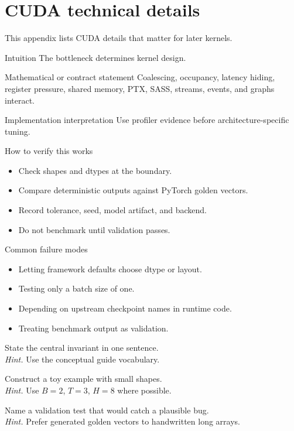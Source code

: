 \chapter{CUDA technical details}
\label{app:cuda-details}
This appendix lists CUDA details that matter for later kernels. \citep{cudaProgrammingGuide}



\begin{intuitionbox}{Intuition}
The bottleneck determines kernel design.
\end{intuitionbox}

\begin{definitionbox}{Mathematical or contract statement}
Coalescing, occupancy, latency hiding, register pressure, shared memory, PTX, SASS, streams, events, and graphs interact.
\end{definitionbox}

\begin{implementationbox}{Implementation interpretation}
Use profiler evidence before architecture-specific tuning.
\end{implementationbox}

\begin{verificationbox}{How to verify this works}
\begin{itemize}
\item Check shapes and dtypes at the boundary.
\item Compare deterministic outputs against PyTorch golden vectors.
\item Record tolerance, seed, model artifact, and backend.
\item Do not benchmark until validation passes.
\end{itemize}
\end{verificationbox}

\begin{warningbox}{Common failure modes}
\begin{itemize}
\item Letting framework defaults choose dtype or layout.
\item Testing only a batch size of one.
\item Depending on upstream checkpoint names in runtime code.
\item Treating benchmark output as validation.
\end{itemize}
\end{warningbox}

\begin{chapterexercises}
\item State the central invariant in one sentence.\\
\textit{Hint.} Use the conceptual guide vocabulary.
\item Construct a toy example with small shapes.\\
\textit{Hint.} Use $B=2$, $T=3$, $H=8$ where possible.
\item Name a validation test that would catch a plausible bug.\\
\textit{Hint.} Prefer generated golden vectors to handwritten long arrays.
\end{chapterexercises}

